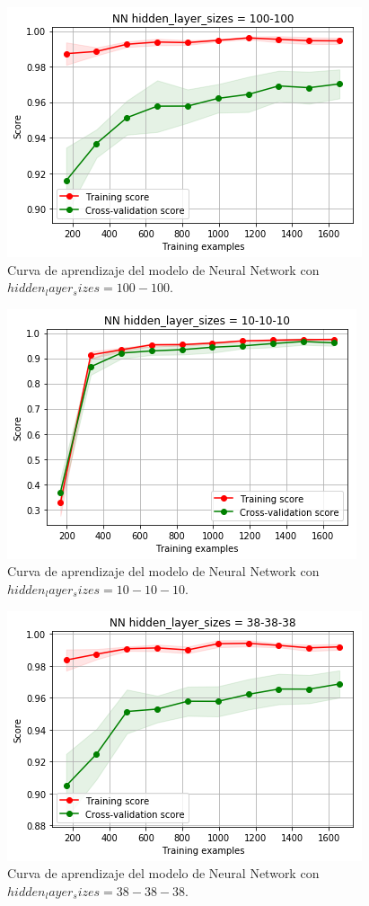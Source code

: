 \documentclass[11pt,a4paper]{article}
\begin{document}
\begin{figure}[H]
    \centering
    \includegraphics[scale=0.7]{img/lc-nn-100-100.png}
    \caption{Curva de aprendizaje del modelo de Neural Network con $hidden_layer_sizes=100-100$.}
    \label{fig:lc-nn-100-100}
\end{figure}

\begin{figure}[H]
    \centering
    \includegraphics[scale=0.7]{img/lc-nn-10-10-10.png}
    \caption{Curva de aprendizaje del modelo de Neural Network con $hidden_layer_sizes=10-10-10$.}
    \label{fig:lc-nn-10-10-10}
\end{figure}

\begin{figure}[H]
    \centering
    \includegraphics[scale=0.7]{img/lc-nn-38-38-38.png}
    \caption{Curva de aprendizaje del modelo de Neural Network con $hidden_layer_sizes=38-38-38$.}
    \label{fig:lc-nn-38-38-38}
\end{figure}
\end{document}
